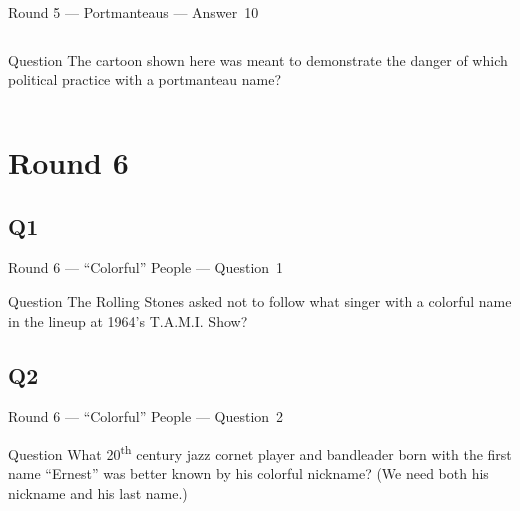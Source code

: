 \documentclass[11pt]{beamer}
\begin{document}
\begin{frame}[t]{Round 5 --- Portmanteaus --- \mbox{Answer 10}}
\vspace{-0.5em}
\begin{columns}[T,totalwidth=\linewidth]
    \begin{column}{0.6\linewidth}
    \begin{block}{Question}
    The cartoon shown here was meant to demonstrate the danger of which political practice with a portmanteau name?
    \end{block}
    \end{column}
    \begin{column}{0.38\linewidth}
    \begin{center}
    \texttt{[image: \{Images/gerrymander]}.jpg}
    \end{center}
    \end{column}
\end{columns}

\end{frame}
\def\thisSectionName{``Colorful'' People}
\section{Round 6}
\subsection*{Q1}
\begin{frame}[t]{Round 6 --- ``Colorful'' People --- \mbox{Question 1}}
\vspace{-0.5em}
\begin{block}{Question}
The Rolling Stones asked not to follow what singer with a colorful name in the lineup at 1964's T.A.M.I. Show?
\end{block}
\end{frame}
\subsection*{Q2}
\begin{frame}[t]{Round 6 --- ``Colorful'' People --- \mbox{Question 2}}
\vspace{-0.5em}
\begin{block}{Question}
What 20\textsuperscript{th} century jazz cornet player and bandleader born with the first name ``Ernest'' was better known by his colorful nickname?  (We need both his nickname and his last name.)
\end{block}
\end{frame}
\end{document}
